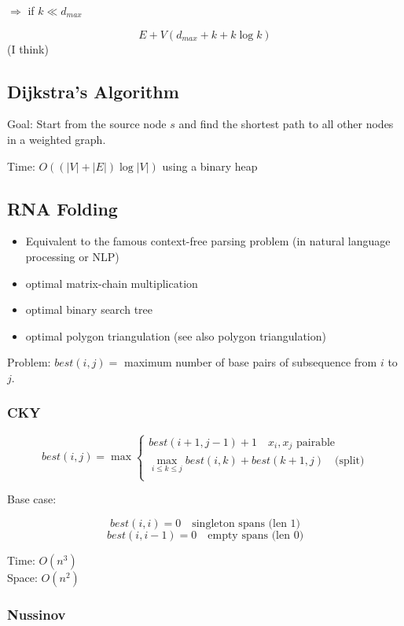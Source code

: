 \documentclass[12pt,a4paper]{article}
\begin{document}
\(\Rightarrow\) if \(k \ll d_{max}\)

\[E + V(d_{max} + k + k\log k)\] (I think)



\subsection*{Dijkstra's Algorithm}

Goal: Start from the source node \(s\) and find the shortest path to all other nodes in a weighted graph.

Time: \(O((|V| + |E|) \log |V|)\) using a binary heap

\subsection*{RNA Folding}

\begin{itemize}
    \item Equivalent to the famous context-free parsing problem (in natural language processing or NLP)
    \item optimal matrix-chain multiplication
    \item optimal binary search tree
    \item optimal polygon triangulation (see also polygon triangulation)
\end{itemize}

Problem: $best(i, j) = $ maximum number of base pairs of subsequence from $i$ to $j$.

\subsubsection*{CKY}

\[
best(i, j) = \max \left\{
\begin{array}{l}
    best(i + 1, j - 1) + 1 \quad \text{$x_i, x_j$ pairable} \\
    \max_{i \leq k \leq j} best(i, k) + best(k + 1, j) \quad \text{(split)} \\
\end{array}
\right.
\]

Base case:

\[best(i,i) = 0 \quad \text{singleton spans (len 1)}\]
\[best(i,i-1) = 0 \quad \text{empty spans (len 0)}\]

Time: \(O(n^3)\)\\
Space: \(O(n^2)\)

\subsubsection*{Nussinov}
\end{document}
